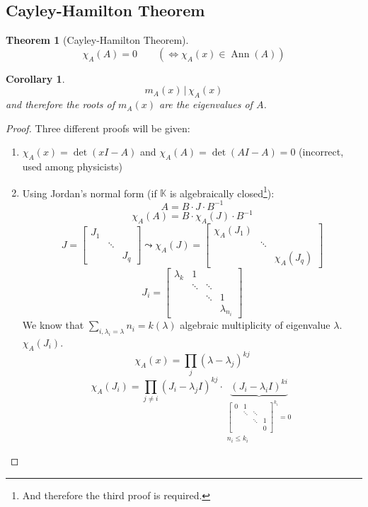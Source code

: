 \documentclass[a4paper]{article}
\newcounter{lecref}[section]
\numberwithin{lecref}{section}
\newtheorem{theorem}[lecref]{Theorem}
\newtheorem{corollary}[lecref]{Corollary}
\newcommand{\divides}{\,\big|\,} %
\begin{document}
\subsection{Cayley-Hamilton Theorem}

\begin{theorem}[Cayley-Hamilton Theorem] %
  \[ \chi_A(A) = 0 \qquad (\iff \chi_A(x) \in \operatorname{Ann}(A)) \]
\end{theorem}

\begin{corollary} %
  \[ m_A(x) \divides{} \chi_A(x) \]
  and therefore the roots of $m_A(x)$ are the eigenvalues of $A$.
\end{corollary}

\begin{proof}
  Three different proofs will be given:
  \begin{enumerate}
    \item $\chi_A(x) = \det(xI - A)$ and $\chi_A(A) = \det(AI - A) = 0$ (incorrect, used among physicists)
    \item Using Jordan's normal form (if $\mathbb K$ is algebraically closed\footnote{And therefore the third proof is required.}):
      \[ A = B \cdot J \cdot B^{-1} \]
      \[ \chi_A(A) = B \cdot \chi_A(J) \cdot B^{-1} \]
      \[ J = \begin{bmatrix} J_1 & & \\ & \ddots & \\ & & J_q \end{bmatrix} \leadsto \chi_A(J) = \begin{bmatrix} \chi_A(J_1) & & \\ & \ddots & \\ & & \chi_A(J_q) \end{bmatrix} \]
      \[ J_i = \begin{bmatrix} \lambda_k & 1 & & \\ & \ddots & \ddots & \\ & & \ddots & 1 \\ & & & \lambda_{n_i} \end{bmatrix}  \]
      We know that $\sum_{i, \lambda_i = \lambda} n_i = k(\lambda)$ algebraic multiplicity of eigenvalue $\lambda$. $\chi_A(J_i)$.
      \[ \chi_A(x) = \prod_j (\lambda - \lambda_j)^{kj} \]
      \[ \chi_A(J_i) = \prod_{j \neq i} (J_i - \lambda_j I)^{kj} \cdot \underbrace{\left(J_i - \lambda_i I\right)^{ki}}_{\substack{\begin{bmatrix} 0 & 1 & & \\ & \ddots & \ddots & \\ & & \ddots & 1 \\ & & & 0 \end{bmatrix}^{k_i} = 0 \\ n_i \leq k_i}} \]

\end{enumerate}
\end{proof}
\end{document}

